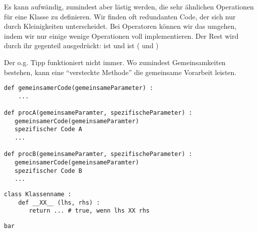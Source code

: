 
\begin{frame}
%
\begin{hintbox}
Es kann aufwändig, zumindest aber lästig werden, die sehr ähnlichen Operationen für eine Klasse zu definieren. Wir finden oft redundanten Code, der sich nur durch Kleinigkeiten unterscheidet. Bei Operatoren können wir das umgehen, indem wir nur einige wenige Operationen voll implementieren. Der Rest wird durch ihr gegenteil ausgedrückt:  ist  und  ist  ( und )
\end{hintbox}
%
\end{frame}


\begin{frame}[fragile]
%
\begin{hintbox}
Der o.\;g. Tipp funktioniert nicht immer. Wo zumindest Gemeinsamkeiten bestehen, kann eine \enquote{versteckte Methode} die gemeinsame Vorarbeit leisten.
\end{hintbox}
%
\begin{codebox}
\begin{verbatim}
def gemeinsamerCode(gemeinsameParameter) :
    ...

def procA(gemeinsameParamter, spezifischeParameter) :
   gemeinsamerCode(gemeinsameParamter)
   spezifischer Code A
   ...

def procB(gemeinsameParamter, spezifischeParameter) :
   gemeinsamerCode(gemeinsameParamter)
   spezifischer Code B
   ...
\end{verbatim}
\end{codebox}
%
\end{frame}


\begin{frame}[fragile]
%
\begin{tcbraster}[raster columns=2,
                  raster equal height,
                  nobeforeafter,
                  raster column skip=0.5cm]
\begin{codebox}
\begin{verbatim}
class Klassenname :
    def __XX__ (lhs, rhs) :
       return ... # true, wenn lhs XX rhs
\end{verbatim}
\end{codebox}
%
\begin{codebox}
\begin{verbatim}
bar
\end{verbatim}
\end{codebox}
\end{tcbraster}
%
\end{frame}


